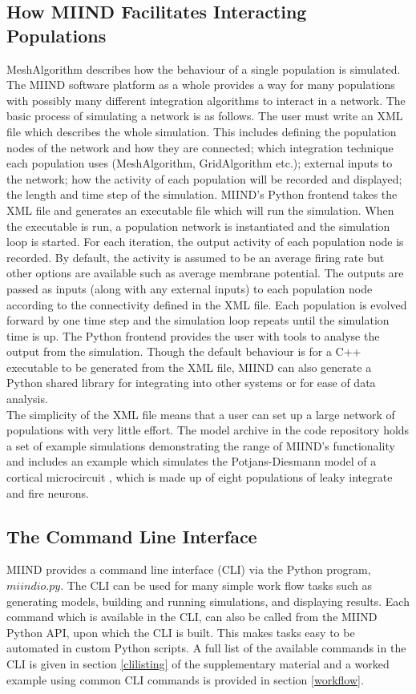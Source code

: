 \documentclass[utf8]{frontiersSCNS} %
\begin{document}
\subsection{How MIIND Facilitates Interacting Populations}
MeshAlgorithm describes how the behaviour of a single population is simulated. The MIIND software platform as a whole provides a way for many populations with possibly many different integration algorithms to interact in a network. The basic process of simulating a network is as follows. The user must write an XML file which describes the whole simulation. This includes defining the population nodes of the network and how they are connected; which integration technique each population uses (MeshAlgorithm, GridAlgorithm etc.); external inputs to the network; how the activity of each population will be recorded and displayed; the length and time step of the simulation. MIIND’s Python frontend takes the XML file and generates an executable file which will run the simulation. When the executable is run, a population network is instantiated and the simulation loop is started. For each iteration, the output activity of each population node is recorded. By default, the activity is assumed to be an average firing rate but other options are available such as average membrane potential. The outputs are passed as inputs (along with any external inputs) to each population node according to the connectivity defined in the XML file. Each population is evolved forward by one time step and the simulation loop repeats until the simulation time is up. The Python frontend provides the user with tools to analyse the output from the simulation. Though the default behaviour is for a C++ executable to be generated from the XML file, MIIND can also generate a Python shared library for integrating into other systems or for ease of data analysis.\\
The simplicity of the XML file means that a user can set up a large network of populations with very little effort. The model archive in the code repository holds a set of example simulations demonstrating the range of MIIND's functionality and includes an example which simulates the Potjans-Diesmann model of a cortical microcircuit \citep{potjans2014cell}, which is made up of eight populations of leaky integrate and fire neurons.\\

\subsection{The Command Line Interface}
MIIND provides a command line interface (CLI) via the Python program, $miindio.py$. The CLI can be used for many simple work flow tasks such as generating models, building and running simulations, and displaying results. Each command which is available in the CLI, can also be called from the MIIND Python API, upon which the CLI is built. This makes tasks easy to be automated in custom Python scripts. A full list of the available commands in the CLI is given in section \ref{clilisting} of the supplementary material and a worked example using common CLI commands is provided in section \ref{workflow}.\\   
\end{document}
